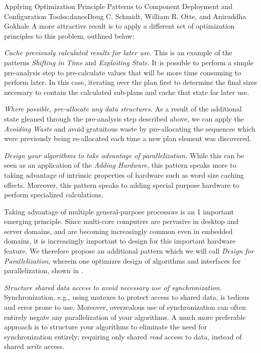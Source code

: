\begin{aosachapter}{Applying Optimization Principle Patterns to Component Deployment and
                    Configuration Tools}{s:dance}{Doug C. Schmidt, William R. Otte, and Aniruddha Gokhale}
A more attractive result is to apply a different set of optimization
principles to this problem, outlined below:

\begin{aosaitemize}
\item
  \emph{Cache previously calculated results for later use.} This is an
  example of the patterns \emph{Shifting in Time} and \emph{Exploiting
  State}. It is possible to perform a simple pre-analysis step to
  pre-calculate values that will be more time consuming to perform
  later. In this case, iterating over the plan first to determine the
  final sizes necessary to contain the calculated sub-plans and cache
  that state for later use.
\item
  \emph{Where possible, pre-allocate any data structures.} As a result
  of the additional state gleaned through the pre-analysis step
  described above, we can apply the \emph{Avoiding Waste} and avoid
  gratuitous waste by pre-allocating the sequences which were previously
  being re-allocated each time a new plan element was discovered.
\item
  \emph{Design your algorithms to take advantage of parallelization.}
  While this can be seen as an application of the \emph{Adding
  Hardware}, this pattern speaks more to taking advantage of intrinsic
  properties of hardware such as word size caching effects. Moreover,
  this pattern speaks to adding special purpose hardware to perform
  specialized calculations.

  Taking advantage of multiple general-purpose processors is an 1
  important emerging principle. Since multi-core computers are pervasive
  in desktop and server domains, and are becoming increasingly common
  even in embedded domains, it is increasingly important to design for
  this important hardware feature. We therefore propose an additional
  pattern which we will call \emph{Design for Parallelization}, wherein
  one optimizes design of algorithms and interfaces for parallelization,
  shown in .
\item
  \emph{Structure shared data access to avoid necessary use of
  synchronization.} Synchronization, e.g., using mutexes to protect
  access to shared data, is tedious and error prone to use. Moreover,
  overzealous use of synchronization can often entirely negate any
  parallelization of your algorithms. A much more preferable approach is
  to structure your algorithms to eliminate the need for synchronization
  entirely; requiring only shared \emph{read} access to data, instead of
  shared \emph{write} access.


\end{aosaitemize}
\end{aosachapter}
